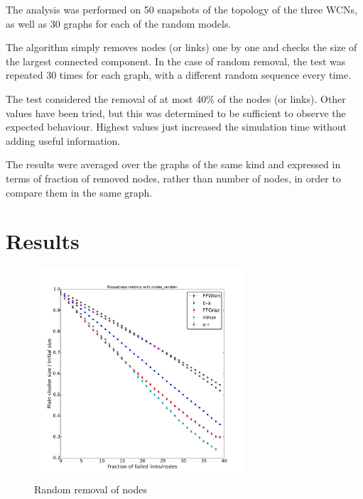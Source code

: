 \documentclass[a4paper,11pt,twoside,openright]{memoir}
\begin{document}
The analysis was performed on 50 snapshots of the topology of the three
WCNs, as well as 30 graphs for each of the random models.

The algorithm simply removes nodes (or links) one by one and checks the
size of the largest connected component. In the case of random removal,
the test was repeated 30 times for each graph, with a different random
sequence every time.

The test considered the removal of at most 40\% of the nodes (or links).
Other values have been tried, but this was determined to be sufficient
to observe the expected behaviour. Highest values just increased the
simulation time without adding useful information.

The results were averaged over the graphs of the same kind and expressed
in terms of fraction of removed nodes, rather than number of nodes, in
order to compare them in the same graph.

\section{Results}\label{results}

\begin{figure}[htbp]
\centering
\includegraphics[width=0.7\textwidth]{graphs/nodes_random_robustness}
\caption{Random removal of nodes}
\label{fig:node_rand}
\end{figure}
\end{document}
